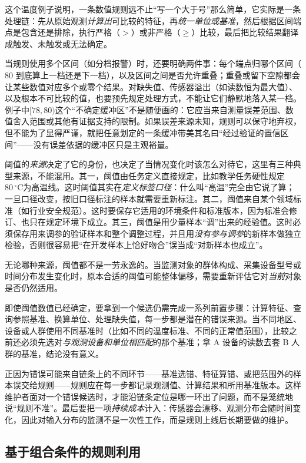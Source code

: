 这个温度例子说明，一条数值规则远不止“写一个大于号”那么简单，它实际是一条处理链：先从原始观测\emph{计算出}可比较的特征，再\emph{统一单位或基准}，然后根据区间端点是包含还是排除，执行严格（$>$）或非严格（$\geq$）比较，最后把比较结果翻译成触发、未触发或无法确定。

当规则使用多个区间（如分档报警）时，还要明确两件事：每个端点归哪个区间（$80$ 到底算上一档还是下一档），以及区间之间是否允许重叠；重叠或留下空隙都会让某些数值对应多个或零个结果。对缺失值、传感器溢出（如读数恒为最大值）、以及根本不可比较的值，也要预先规定处理方式，不能让它们静默地落入某一档。例子中$[78,80)$这个“不确定缓冲区”不是随便画的：它应当来自测量误差范围、数值舍入范围或其他有证据支持的限制。如果误差来源未知，规则可以保守地弃权，但不能为了显得严谨，就把任意划定的一条缓冲带美其名曰“经过验证的置信区间”——没有误差依据的缓冲区只是主观裕量。

阈值的\emph{来源}决定了它的身份，也决定了当情况变化时该怎么对待它，这里有三种典型来源，不能混用。其一，阈值由任务定义直接规定，比如教学任务硬性规定$80\,\mathrm{^\circ C}$为高温线。这时阈值其实在\emph{定义标签口径}：什么叫“高温”完全由它说了算；一旦口径改变，按旧口径标注的样本就需要重新标注。其二，阈值来自某个领域标准（如行业安全规范）。这时要保存它适用的环境条件和标准版本，因为标准会修订、也只在规定环境下成立。其三，阈值是用少量样本“调”出来的经验值。这时必须保存用来调参的验证样本和整个调整过程，并且用\emph{没有参与调参}的新样本做独立检验，否则很容易把“在开发样本上恰好吻合”误当成“对新样本也成立”。

无论哪种来源，阈值都不是一劳永逸的。当监测对象的群体构成、采集设备型号或时间分布发生变化时，原本合适的阈值可能整体偏移，需要重新评估它对\emph{当前}对象是否仍然适用。

即使阈值数值已经确定，要拿到一个候选仍需完成一系列前置步骤：计算特征、查询参照基准、换算单位、处理缺失值，每一步都是潜在的错误来源。当不同地区、设备或人群使用不同基准时（比如不同的温度标准、不同的正常值范围），比较之前还必须先选对\emph{与观测设备和单位相匹配}的那个基准；拿 A 设备的读数去套 B 人群的基准，结论没有意义。

正因为错误可能来自链条上的不同环节——基准选错、特征算错、或把范围外的样本误交给规则——规则应在每一步都记录观测值、计算结果和所用基准版本。这样维护者面对一个错误候选时，才能沿链条定位是哪一环出了问题，而不是笼统地说“规则不准”。最后要把一项\emph{持续成本}计入：传感器会漂移、观测分布会随时间变化，因此对输入分布的监测不是一次性工作，而是规则上线后长期要做的维护。

\subsection{基于组合条件的规则利用}
\label{sec:rule-based-knowledge-acquisition-composite-pattern}

